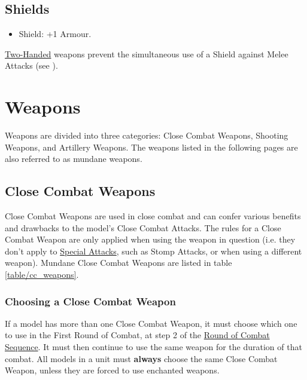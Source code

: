 \subsection{Shields}
\idx[main=y]{\shield}

\begin{itemize}
\item Shield: +1 Armour.
\end{itemize}

\hyperref[twohanded]{Two-Handed} weapons prevent the simultaneous use of a Shield against Melee Attacks (see ).

\section{Weapons}
\label{weapons}

Weapons are divided into three categories: Close Combat Weapons, Shooting Weapons, and Artillery Weapons. The weapons listed in the following pages are also referred to as mundane weapons.

\subsection{Close Combat Weapons}
\label{close_combat_weapons}

Close Combat Weapons are used in close combat and can confer various benefits and drawbacks to the model's Close Combat Attacks. The rules for a Close Combat Weapon are only applied when using the weapon in question (i.e. they don't apply to \hyperref[special_attacks]{Special Attacks}, such as Stomp Attacks, or when using a different weapon). Mundane Close Combat Weapons are listed in table \ref{table/cc_weapons}.

\subsubsection{Choosing a Close Combat Weapon}

If a model has more than one Close Combat Weapon, it must choose which one to use in the First Round of Combat, at step 2 of the \hyperref[round_of_combat_sequence]{Round of Combat Sequence}. It must then continue to use the same weapon for the duration of that combat. All \rnf{} models in a unit must \textbf{always} choose the same Close Combat Weapon, unless they are forced to use enchanted weapons.

